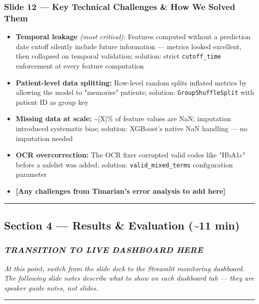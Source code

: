 \documentclass[11pt,a4paper]{article}
\begin{document}
\subsubsection{Slide 12 --- Key Technical Challenges \& How We Solved Them}
\begin{itemize}
\item \textbf{Temporal leakage} \emph{(most critical):} Features computed without a prediction date cutoff silently include future information --- metrics looked excellent, then collapsed on temporal validation; solution: strict \texttt{cutoff\_time} enforcement at every feature computation
\item \textbf{Patient-level data splitting:} Row-level random splits inflated metrics by allowing the model to "memorise" patients; solution: \texttt{GroupShuffleSplit} with patient ID as group key
\item \textbf{Missing data at scale:} \textasciitilde{}[X]\% of feature values are NaN; imputation introduced systematic bias; solution: XGBoost's native NaN handling --- no imputation needed
\item \textbf{OCR overcorrection:} The OCR fixer corrupted valid codes like "HbA1c" before a safelist was added; solution: \texttt{valid\_mixed\_terms} configuration parameter
\item \textbf{[Any challenges from Timarian's error analysis to add here]}
\end{itemize}

\noindent\rule{\linewidth}{0.4pt}

\subsection{Section 4 --- Results \& Evaluation (\textasciitilde{}11 min)}
\subsubsection{\textbf{\emph{ TRANSITION TO LIVE DASHBOARD HERE }}}
\emph{At this point, switch from the slide deck to the Streamlit monitoring dashboard. The following slide notes describe what to show on each dashboard tab --- they are speaker guide notes, not slides.}

\noindent\rule{\linewidth}{0.4pt}
\end{document}
